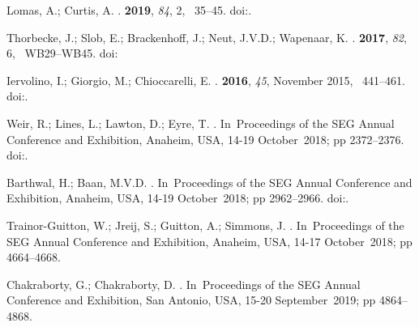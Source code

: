 \documentclass[geosciences,article,submit,moreauthors,pdftex]{Definitions/mdpi}
\begin{document}
\begin{thebibliography}{999}
Lomas, A.; Curtis, A.
.
 {\bf 2019}, {\em 84}, {2}, ~35--45.
\newblock
 doi:{\href{ https://doi.org/10.1190/geo2018-0068.1}{}}.

Thorbecke, J.; Slob, E.; Brackenhoff, J.; Neut, J.V.D.; Wapenaar, K.
.
 {\bf 2017}, {\em 82}, {6}, ~WB29--WB45.
 doi:{\href{https://doi.org/10.1190/geo2017-0108.1}{}}

Iervolino, I.; Giorgio, M.; Chioccarelli, E.
.
 {\bf 2016}, {\em 45}, {November 2015}, ~441--461.
\newblock
 doi:{\href{ https://doi.org/10.1002/eqe}{}}.

Weir, R.; Lines, L.; Lawton, D.; Eyre, T.
.
\newblock In~Proceedings of the SEG Annual Conference and Exhibition, Anaheim, USA, 14-19 October~2018; pp 2372--2376.
doi:{\href{ https://doi.org/10.1190/segam2018-2980345.1}{}}.

Barthwal, H.; Baan, M.V.D.
.
\newblock In~Proceedings of the SEG Annual Conference and Exhibition, Anaheim, USA, 14-19 October~2018; pp 2962--2966.
doi:{\href{ https://doi.org/10.1190/segam2018-2980345.1}{}}.

Trainor-Guitton, W.; Jreij, S.; Guitton, A.; Simmons, J. 
.
\newblock In~Proceedings of the SEG Annual Conference and Exhibition, Anaheim, USA, 14-17 October~2018; pp 4664--4668.

Chakraborty, G.; Chakraborty, D. 
.
\newblock In~Proceedings of the SEG Annual Conference and Exhibition, San Antonio, USA, 15-20 September~2019; pp 4864--4868.


\end{thebibliography}
\end{document}

